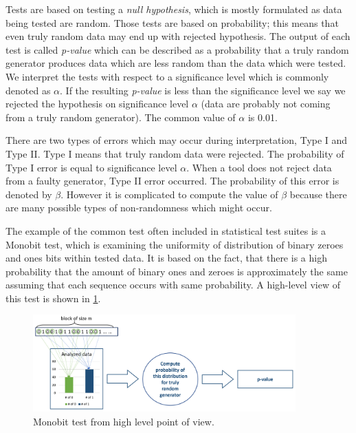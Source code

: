 \documentclass[
    digital,    %
    oneside,    %
    color,
    11pt,
    nocover,
    notable,
    nolof,
    nolot,
    final
]{fithesis3}
\renewcommand\_{\textunderscore\allowbreak}
\begin{document}
Tests are based on testing a \textit{null hypothesis}, which is mostly formulated as data being tested are random. Those tests are based on probability; this means that even truly random data may end up with rejected hypothesis. The output of each test is called \textit{p-value} which can be described as a probability that a truly random generator produces data which are less random than the data which were tested. We interpret the tests with respect to a significance level which is commonly denoted as $\alpha$. If the resulting \textit{p-value} is less than the significance level we say we rejected the hypothesis on significance level $\alpha$ (data are probably not coming from a truly random generator). The common value of $\alpha$ is 0.01. \cite{nist-explanation}

There are two types of errors which may occur during interpretation, Type I and Type II. Type I means that truly random data were rejected. The probability of Type I error is equal to significance level $\alpha$. When a tool does not reject data from a faulty generator, Type II error occurred. The probability of this error is denoted by $\beta$. However it is complicated to compute the value of $\beta$ because there are many possible types of non-randomness which might occur. \cite{nist-explanation}

The example of the common test often included in statistical test suites is a Monobit test, which is examining the uniformity of distribution of binary zeroes and ones bits within tested data. It is based on the fact, that there is a high probability that the amount of binary ones and zeroes is approximately the same assuming that each sequence occurs with same probability. A high-level view of this test is shown in \cref{fig:monobit}. 

\begin{figure}[h]
	\centering
	\includegraphics[width=0.9\textwidth]{./images/pictures/monobit-high-level.png}
	\caption{Monobit test from high level point of view.}
	\label{fig:monobit}
\end{figure}
\end{document}
